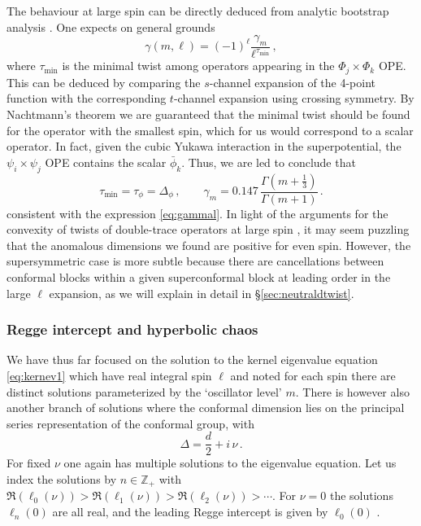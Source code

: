 \documentclass[11pt]{article}
\newcommand{\phib}{\bar{\phi}}
\begin{document}
The behaviour at large spin can be directly deduced from analytic bootstrap analysis 
\cite{Fitzpatrick:2012yx}. One expects on general grounds 
%
\begin{equation}\label{eq:gammagen}
\gamma(m,\ell) = (-1)^{\ell}\frac{\gamma_m}{\ell^{\tau_\text{min}}} \,,
\end{equation}	
%
where $\tau_\text{min}$ is the minimal twist among operators appearing in the $\Phi_j \times \Phi_k$ OPE. This can be deduced by comparing the $s$-channel expansion of the 4-point function with the corresponding $t$-channel expansion using crossing symmetry. 
By Nachtmann's theorem we are guaranteed that the minimal twist should be found for the operator with the smallest spin, which for us would correspond to a scalar operator. In fact, given the cubic Yukawa interaction in the superpotential, the $\psi_i\times \psi_j$ OPE contains the scalar $\phib_k$. Thus, we are led to conclude that 
%
\begin{equation}\label{eq:taumin}
\tau_\text{min} = \tau_\phi  = \Delta_\phi \,, \qquad \gamma_m =  0.147 \, \frac{\Gamma(m+\frac{1}{3})}{\Gamma(m+1)}\,.
\end{equation}	
%
consistent with the expression \eqref{eq:gammal}. In light of the arguments for the convexity of twists of double-trace operators at large spin \cite{Fitzpatrick:2012yx, Komargodski:2012ek}, it may seem puzzling that the anomalous dimensions we found are positive for even spin. However, the supersymmetric case is more subtle because there are cancellations between conformal blocks within a given superconformal block at leading order in the large $\ell$ expansion, as we will explain in detail in \S\ref{sec:neutraldtwist}.

\subsubsection{Regge intercept and hyperbolic chaos}
\label{sec:Regge}

We have thus far focused on the solution to the kernel eigenvalue equation \eqref{eq:kernev1} which have real integral spin $\ell$ and noted for each spin there are distinct solutions parameterized by the `oscillator level' $m$. There is however also another branch of solutions where the conformal dimension lies on the principal series representation of the conformal group, with 
%
\begin{equation}\label{eq:prinser}
\Delta  = \frac{d}{2} + i\, \nu \,.
\end{equation}	
%
For fixed $\nu$ one again has multiple solutions to the eigenvalue equation. Let us index the solutions by $n \in \mathbb{Z}_+$ with 
$\Re(\ell_0(\nu)) > \Re(\ell_1(\nu)) > \Re(\ell_2(\nu)) > \cdots $. For $\nu =0$ the solutions $\ell_n(0)$ are all real, and the leading Regge intercept is given by $\ell_0(0)$ \cite{Costa:2012cb}. 
\end{document}
